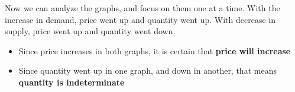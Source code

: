 Now we can analyze the graphs, and focus on them one at a time. With the increase in demand, price went up and quantity went up. With decrease in supply, price went up and quantity went down. 
\begin{itemize}
    \item Since price increases in both graphs, it is certain that \textbf{price will increase}
    \item Since quantity went up in one graph, and down in another, that means \textbf{quantity is indeterminate}
\end{itemize}

